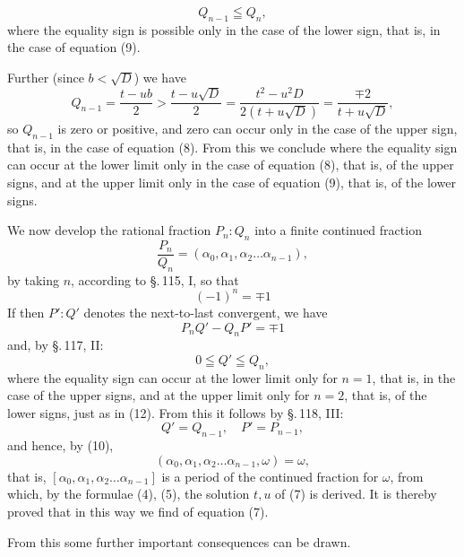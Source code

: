 \[
Q_{n-1} \leqq Q_n,
\]
where the equality sign is possible only in the case of the lower
sign, that is, in the case of equation (9).

Further (since $b < \sqrt{D}$) we have
\[
Q_{n-1} = \frac{t-ub}{2} > \frac{t-u\sqrt{D}}{2} = \frac{t^2-u^2D}{2(t+u\sqrt{D})} = \frac{\mp 2}{t+u\sqrt{D}},
\]
so $Q_{n-1}$ is zero or positive, and zero can occur only in the case
of the upper sign, that is, in the case of equation (8).
From this we conclude
where the equality sign can occur at the lower limit only in the
case of equation (8), that is, of the upper signs, and at the upper
limit only in the case of equation (9), that is, of the lower signs.

We now develop the rational fraction $P_n : Q_n$ into a finite
continued fraction
\[
\frac{P_n}{Q_n} = (\alpha_0, \alpha_1, \alpha_2 \ldots \alpha_{n-1}),
\]
by taking $n$, according to \S.\,115, I, so that
\[
(-1)^n = \mp 1
\]
If then $P' : Q'$ denotes the next-to-last convergent, we have
\[
P_n Q' - Q_n P' = \mp 1
\]
and, by \S.\,117, II:
\[
0 \leqq Q' \leqq Q_n,
\]
where the equality sign can occur at the lower limit only for $n=1$,
that is, in the case of the upper signs, and at the upper limit only
for $n=2$, that is, of the lower signs, just as in (12). From this
it follows by \S.\,118, III:
\[
Q' = Q_{n-1}, \quad P' = P_{n-1},
\]
and hence, by (10),
\[
(\alpha_0, \alpha_1, \alpha_2 \ldots \alpha_{n-1}, \omega) = \omega,
\]
that is, $[\alpha_0, \alpha_1, \alpha_2 \ldots \alpha_{n-1}]$ is a period of the continued fraction for
$\omega$, from which, by the formulae (4), (5), the solution $t, u$ of (7)
is derived. It is thereby proved that in this way we find
 of equation (7).

From this some further important consequences can be drawn.
